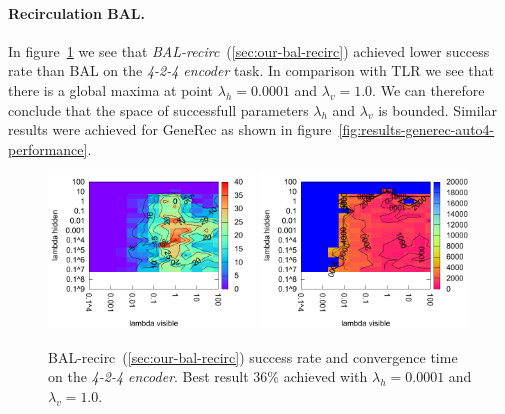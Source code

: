 \paragraph{Recirculation BAL.} 
In figure~\ref{fig:results-bal-recirc-auto4-performance} we see that \emph{BAL-recirc}~(\ref{sec:our-bal-recirc}) achieved lower success rate than BAL on the \emph{4-2-4 encoder} task. In comparison with TLR we see that there is a global maxima at point $\lambda_h = 0.0001$ and $\lambda_v=1.0$. We can therefore conclude that the space of successfull parameters $\lambda_h$ and $\lambda_v$ is bounded. Similar results were achieved for GeneRec as shown in figure~\ref{fig:results-generec-auto4-performance}.
\begin{figure}[H]
  \centering
  \includegraphics[width=0.49\textwidth]{img/bal-recirc-auto4-success.pdf}   
  \includegraphics[width=0.49\textwidth]{img/bal-recirc-auto4-epoch.pdf}     
  \caption{BAL-recirc~(\ref{sec:our-bal-recirc}) success rate and convergence time on the \emph{4-2-4 encoder}. Best result $36\%$ achieved with $\lambda_h = 0.0001$ and $\lambda_v=1.0$.}
  \label{fig:results-bal-recirc-auto4-performance}
\end{figure}


